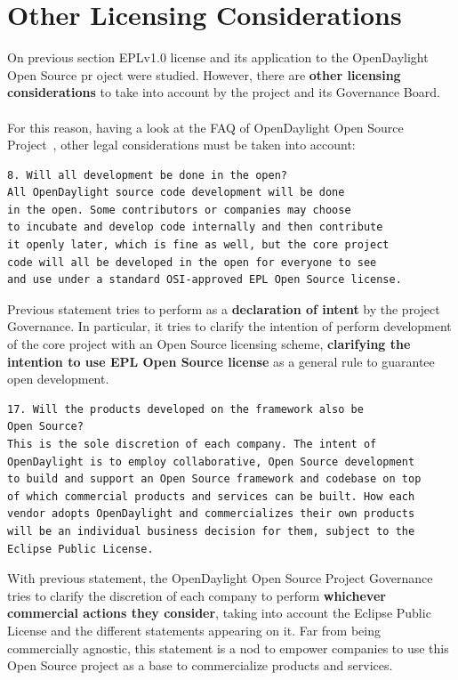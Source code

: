 \documentclass[a4paper, 12pt]{book}
\begin{document}
\section{Other Licensing Considerations}
\label{sec:otherlicenseconsiderations}

On previous section EPLv1.0 license and its application to the OpenDaylight Open Source pr oject were studied. However, there are \textbf{other licensing considerations} to take into account by the project and its Governance Board.\\
\\
For this reason, having a look at the FAQ of OpenDaylight Open Source Project~\cite{OpenDaylightFAQ}, other legal considerations must be taken into account:

\begin{verbatim}
8. Will all development be done in the open?
All OpenDaylight source code development will be done
in the open. Some contributors or companies may choose
to incubate and develop code internally and then contribute
it openly later, which is fine as well, but the core project
code will all be developed in the open for everyone to see
and use under a standard OSI-approved EPL Open Source license.
\end{verbatim}
Previous statement tries to perform as a \textbf{declaration of intent} by the project Governance. In particular, it tries to clarify the intention of perform development of the core project with an Open Source licensing scheme, \textbf{clarifying the intention to use EPL Open Source license} as a general rule to guarantee open development.

\begin{verbatim}
17. Will the products developed on the framework also be
Open Source?
This is the sole discretion of each company. The intent of
OpenDaylight is to employ collaborative, Open Source development
to build and support an Open Source framework and codebase on top
of which commercial products and services can be built. How each
vendor adopts OpenDaylight and commercializes their own products
will be an individual business decision for them, subject to the
Eclipse Public License.
\end{verbatim}
With previous statement, the OpenDaylight Open Source Project Governance tries to clarify the discretion of each company to perform \textbf{whichever commercial actions they consider}, taking into account the Eclipse Public License and the different statements appearing on it. Far from being commercially agnostic, this statement is a nod to empower companies to use this Open Source project as a base to commercialize products and services.
\end{document}
